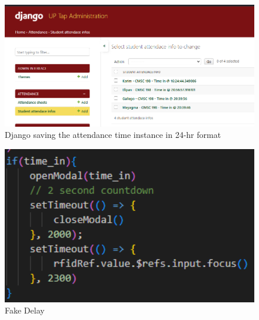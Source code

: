 \begin{figure}[h] %
	\centering
	\includegraphics[width=1.0\textwidth]{figures/chapter4/backendrecord.png} %
	\caption{Django saving the attendance time instance in 24-hr format}
	\label{fig:record}
\end{figure}
\begin{figure}[h] %
	\centering
	\includegraphics[width=1.0\textwidth]{figures/chapter4/delay.png} %
	\caption{Fake Delay}
	\label{fig:delay}
\end{figure}




